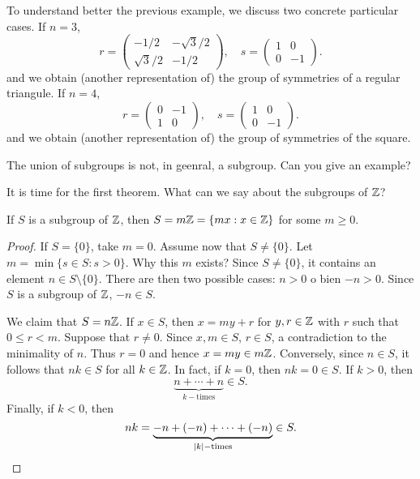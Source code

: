 To understand better the previous example, 
we discuss two concrete particular cases. 
If $n=3$, 
\[
r=\begin{pmatrix}
-1/2 & -\sqrt{3}/2\\
\sqrt{3}/2 & -1/2
\end{pmatrix},
\quad
s=\begin{pmatrix}
        1 & 0\\
        0 & -1
\end{pmatrix}.
\]
and we obtain (another representation of) the group of symmetries of a regular 
triangule. 
If 
$n=4$, 
\[
r=\begin{pmatrix}
0 & -1\\
1 & 0
\end{pmatrix},
\quad
s=\begin{pmatrix}
        1 & 0\\
        0 & -1
\end{pmatrix}.
\]
and we obtain (another representation of) the group of symmetries of the square. 

\begin{exercise}
        The union of subgroups is not, in geenral, 
        a subgroup. Can you give an example? 
\end{exercise}


It is time for the first theorem. 
What can we say about the subgroups of $\mathbb{Z}$? 

\begin{theorem}
        \label{thm:Z}
        If $S$ is a subgroup of $\mathbb{Z}$, then
                $S=m\mathbb{Z}=\{mx:x\in \mathbb{Z}\}$
                for some $m\geq0$.
        \end{theorem}
        
        \begin{proof}
                If $S=\{0\}$, take $m=0$. 
                Assume now that $S\ne\{0\}$. Let 
                $m=\min\{s\in S:s>0\}$. 
                Why this $m$ exists?  
                Since $S\ne\{0\}$,  
                it contains 
                an element $n\in S\setminus\{0\}$. 
                There are then two possible cases: 
                $n>0$ o bien $-n>0$. Since 
                $S$ is a subgroup of $\mathbb{Z}$, $-n\in S$.
        
                We claim that $S=n\mathbb{Z}$.
                If $x\in S$, then $x=my+r$ for $y,r\in\mathbb{Z}$ with $r$ such that
                $0\leq r<m$. Suppose that $r\ne 0$. Since $x,m\in S$, $r\in S$,
                a contradiction to the minimality of $n$. Thus $r=0$ 
                and hence $x=my\in
                m\mathbb{Z}$. Conversely, since $n\in S$, it follows that
                 $nk\in S$ for all $k\in\mathbb{Z}$. In fact, if $k=0$, then 
                 $nk=0\in S$. If $k>0$, 
                 then 
                \[
                \underbrace{n+\cdots+n}_{k-\text{times}}\in S.
                \]
                Finally, if $k<0$, 
                then 
                \[
                nk=\underbrace{-n+(-n)+\cdots+(-n)}_{|k|-\text{times}}\in S.\qedhere
                \]
        \end{proof}

